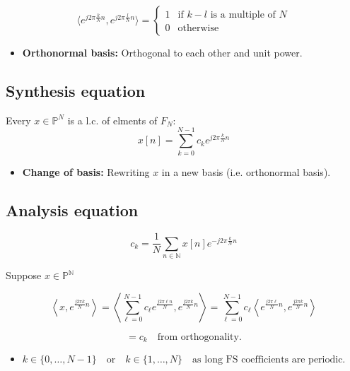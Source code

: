 \begin{definition}
    \begin{equation*}
        \langle e^{j2\pi \frac{k}{N} n},e^{j2\pi \frac{l}{N} n} \rangle = 
        \begin{cases}
            1 & \text{if $k-l$ is a multiple of $N$} \\
            0 & \text{otherwise}
        \end{cases}
    \end{equation*}
    \begin{itemize}
        \item \textbf{Orthonormal basis:} Orthogonal to each other and unit power. 
    \end{itemize}
\end{definition}

\subsection{Synthesis equation}
\begin{definition}
    Every $x \in \mathbb{P}^N$ is a l.c. of elments of $F_N$: 
    \begin{equation*}
        x[n] = \sum_{k=0}^{N-1} c_k e^{j 2\pi \frac{k}{N} n}
    \end{equation*}
    \begin{itemize}
        \item \textbf{Change of basis:} Rewriting $x$ in a new basis (i.e. orthonormal basis).
    \end{itemize}
\end{definition}

\subsection{Analysis equation}
\begin{definition}
    \begin{equation*}
        c_k = \frac{1}{N} \sum_{n \in \mathbb{N}} x[n] e^{-j2\pi \frac{k}{N} n} 
    \end{equation*}
\end{definition}

\begin{derivation}
    Suppose \( x \in \mathbb{P}^{\mathbb{N}} \)

    \[
    \left\langle x, e^{\frac{j2\pi k}{N} n} \right\rangle 
    = \left\langle \sum_{\ell = 0}^{N-1} c_\ell e^{\frac{j2\pi \ell n}{N}}, e^{\frac{j2\pi k}{N} n} \right\rangle
    = \sum_{\ell = 0}^{N-1} c_\ell \left\langle e^{\frac{j2\pi \ell}{N} n}, e^{\frac{j2\pi k}{N} n} \right\rangle
    \]

    \[
    = c_k \quad \text{from orthogonality.}
    \]
    \begin{itemize}
        \item $k \in \{ 0, \dots, N-1 \} \quad \text{or} \quad k \in \{1, \dots, N \} \quad \text{as long FS coefficients are periodic.}$
    \end{itemize}

\end{derivation}

